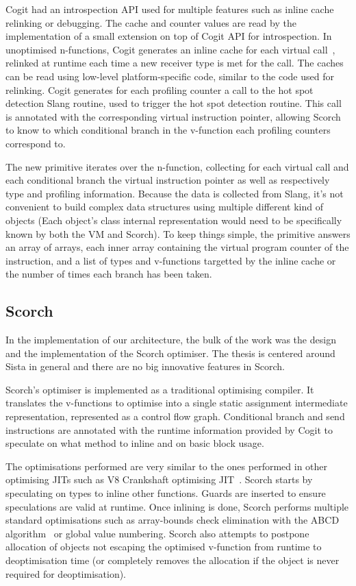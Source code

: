 \documentclass[a4paper,12pt,twoside]{../includes/ThesisStyle}
\begin{document}
Cogit had an introspection API used for multiple features such as inline cache relinking or debugging. The cache and counter values are read by the implementation of a small extension on top of Cogit API for introspection. In unoptimised n-functions, Cogit generates an inline cache for each virtual call~\cite{Deut84a,Holz91a}, relinked at runtime each time a new receiver type is met for the call. The caches can be read using low-level platform-specific code, similar to the code used for relinking. Cogit generates for each profiling counter a call to the hot spot detection Slang routine, used to trigger the hot spot detection routine. This call is annotated with the corresponding virtual instruction pointer, allowing Scorch to know to which conditional branch in the v-function each profiling counters correspond to.

The new primitive iterates over the n-function, collecting for each virtual call and each conditional branch the virtual instruction pointer as well as respectively type and profiling information. Because the data is collected from Slang, it's not convenient to build complex data structures using multiple different kind of objects (Each object's class internal representation would need to be specifically known by both the VM and Scorch). To keep things simple, the primitive answers an array of arrays, each inner array containing the virtual program counter of the instruction, and a list of types and v-functions targetted by the inline cache or the number of times each branch has been taken.

\subsection{Scorch}

In the implementation of our architecture, the bulk of the work was the design and the implementation of the Scorch optimiser. The thesis is centered around Sista in general and there are no big innovative features in Scorch.

Scorch's optimiser is implemented as a traditional optimising compiler. It translates the v-functions to optimise into a single static assignment intermediate representation, represented as a control flow graph. Conditional branch and send instructions are annotated with the runtime information provided by Cogit to speculate on what method to inline and on basic block usage.

The optimisations performed are very similar to the ones performed in other optimising JITs such as V8 Crankshaft optimising JIT~\cite{V8}. Scorch starts by speculating on types to inline other functions. Guards are inserted to ensure speculations are valid at runtime. Once inlining is done, Scorch performs multiple standard optimisations such as array-bounds check elimination with the ABCD algorithm~\cite{Bodi00a} or global value numbering. Scorch also attempts to postpone allocation of objects not escaping the optimised v-function from runtime to deoptimisation time (or completely removes the allocation if the object is never required for deoptimisation).
\end{document}
